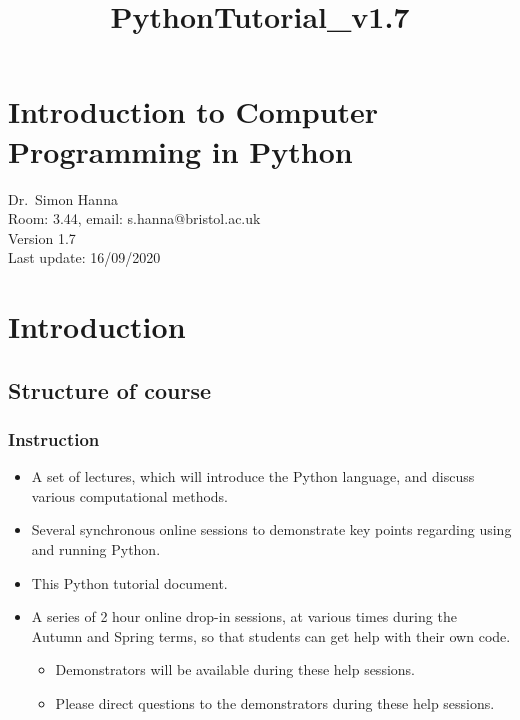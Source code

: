 \documentclass[10pt]{article}
\title{PythonTutorial\_v1.7}
\providecommand{\tightlist}{%
      \setlength{\itemsep}{0pt}\setlength{\parskip}{0pt}}
\begin{document}
    
    
    

    
    \hypertarget{introduction-to-computer-programming-in-python}{%
\section*{Introduction to Computer Programming in
Python}\label{introduction-to-computer-programming-in-python}}

    Dr.~Simon Hanna\\
    Room: 3.44, email: s.hanna@bristol.ac.uk \\
    Version 1.7\\
    Last update: 16/09/2020

\tableofcontents

    \hypertarget{introduction}{%
\section{Introduction}\label{introduction}}

    \hypertarget{structure-of-course}{%
\subsection{Structure of course}\label{structure-of-course}}

    \hypertarget{instruction}{%
\subsubsection{Instruction}\label{instruction}}

\begin{itemize}
\tightlist
\item
  A set of lectures, which will introduce the Python language, and
  discuss various computational methods.
\item
  Several synchronous online sessions to demonstrate key points
  regarding using and running Python.
\item
  This Python tutorial document.
\item
  A series of 2 hour online drop-in sessions, at various times during
  the Autumn and Spring terms, so that students can get help with their
  own code.

  \begin{itemize}
  \tightlist
  \item
    Demonstrators will be available during these help sessions.
  \item
    Please direct questions to the demonstrators during these help
    sessions.
  \end{itemize}
\end{itemize}
\end{document}
